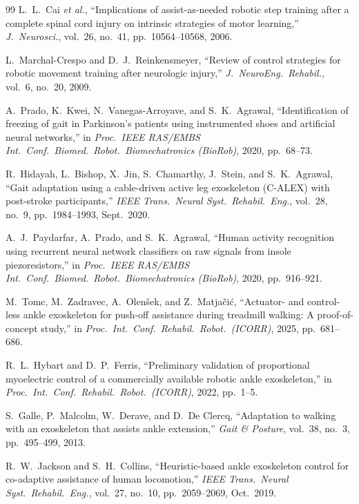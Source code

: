 \documentclass[conference]{IEEEtran}
\begin{document}
\begin{thebibliography}{99}
 L.~L.~Cai \emph{et al.}, ``Implications of assist-as-needed robotic step training after a complete spinal cord injury on intrinsic strategies of motor learning,'' \emph{J.~Neurosci.}, vol.~26, no.~41, pp.~10564--10568, 2006.

 L.~Marchal-Crespo and D.~J.~Reinkensmeyer, ``Review of control strategies for robotic movement training after neurologic injury,'' \emph{J.~NeuroEng.~Rehabil.}, vol.~6, no.~20, 2009.

 A.~Prado, K.~Kwei, N.~Vanegas-Arroyave, and S.~K.~Agrawal, ``Identification of freezing of gait in Parkinson's patients using instrumented shoes and artificial neural networks,'' in \emph{Proc.~IEEE RAS/EMBS Int.~Conf.~Biomed.~Robot.~Biomechatronics (BioRob)}, 2020, pp.~68--73.

 R.~Hidayah, L.~Bishop, X.~Jin, S.~Chamarthy, J.~Stein, and S.~K.~Agrawal, ``Gait adaptation using a cable-driven active leg exoskeleton (C-ALEX) with post-stroke participants,'' \emph{IEEE Trans.~Neural Syst.~Rehabil.~Eng.}, vol.~28, no.~9, pp.~1984--1993, Sept.~2020.

 A.~J.~Paydarfar, A.~Prado, and S.~K.~Agrawal, ``Human activity recognition using recurrent neural network classifiers on raw signals from insole piezoresistors,'' in \emph{Proc.~IEEE RAS/EMBS Int.~Conf.~Biomed.~Robot.~Biomechatronics (BioRob)}, 2020, pp.~916--921.

 M.~Tomc, M.~Zadravec, A.~Olen\v{s}ek, and Z.~Matja\v{c}i\'c, ``Actuator- and control-less ankle exoskeleton for push-off assistance during treadmill walking: A proof-of-concept study,'' in \emph{Proc.~Int.~Conf.~Rehabil.~Robot.~(ICORR)}, 2025, pp.~681--686.

 R.~L.~Hybart and D.~P.~Ferris, ``Preliminary validation of proportional myoelectric control of a commercially available robotic ankle exoskeleton,'' in \emph{Proc.~Int.~Conf.~Rehabil.~Robot.~(ICORR)}, 2022, pp.~1--5.

 S.~Galle, P.~Malcolm, W.~Derave, and D.~De Clercq, ``Adaptation to walking with an exoskeleton that assists ankle extension,'' \emph{Gait \& Posture}, vol.~38, no.~3, pp.~495--499, 2013.

 R.~W.~Jackson and S.~H.~Collins, ``Heuristic-based ankle exoskeleton control for co-adaptive assistance of human locomotion,'' \emph{IEEE Trans.~Neural Syst.~Rehabil.~Eng.}, vol.~27, no.~10, pp.~2059--2069, Oct.~2019.


\end{thebibliography}
\end{document}
